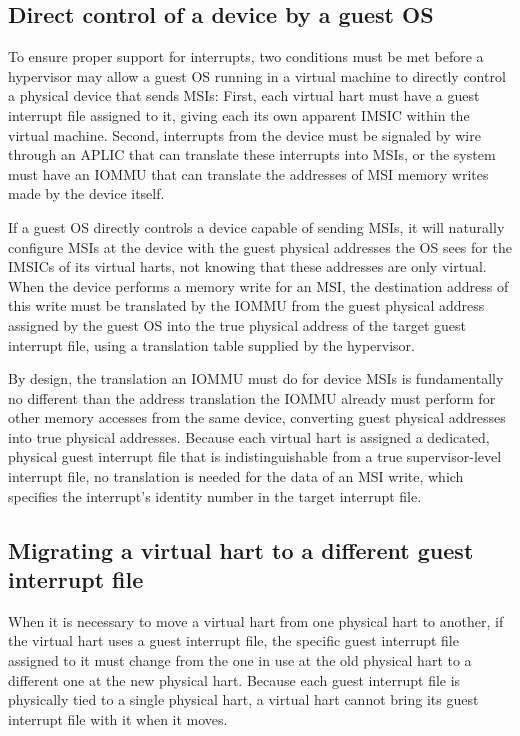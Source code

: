 \subsection{Direct control of a device by a guest OS}

To ensure proper support for interrupts, two conditions must be met
before a hypervisor may allow a guest OS running in a virtual machine
to directly control a physical device that sends MSIs:
First, each virtual hart must have a guest interrupt file assigned to
it, giving each its own apparent IMSIC within the virtual machine.
Second, interrupts from the device must be signaled by wire through
an APLIC that can translate these interrupts into MSIs, or the
system must have an \mbox{IOMMU} that can translate the addresses of MSI
memory writes made by the device itself.

If a guest OS directly controls a device capable of sending MSIs, it
will naturally configure MSIs at the device with the guest physical
addresses the OS sees for the IMSICs of its virtual harts, not knowing
that these addresses are only virtual.
When the device performs a memory write for an MSI, the destination
address of this write must be translated by the \mbox{IOMMU} from the
guest physical address assigned by the guest OS into the true physical
address of the target guest interrupt file, using a translation table
supplied by the hypervisor.

By design, the translation an \mbox{IOMMU} must do for device MSIs is
fundamentally no different than the address translation the \mbox{IOMMU}
already must perform for other memory accesses from the same device,
converting guest physical addresses into true physical addresses.
Because each virtual hart is assigned a dedicated, physical guest
interrupt file that is indistinguishable from a true supervisor-level
interrupt file, no translation is needed for the data of an MSI write,
which specifies the interrupt's identity number in the target interrupt
file.

\subsection{Migrating a virtual hart to a different guest interrupt file}
\label{sec:virtHartMigration}

When it is necessary to move a virtual hart from one physical hart to
another, if the virtual hart uses a guest interrupt file, the specific
guest interrupt file assigned to it must change from the one in use at
the old physical hart to a different one at the new physical hart.
Because each guest interrupt file is physically tied to a single
physical hart, a virtual hart cannot bring its guest interrupt file
with it when it moves.

